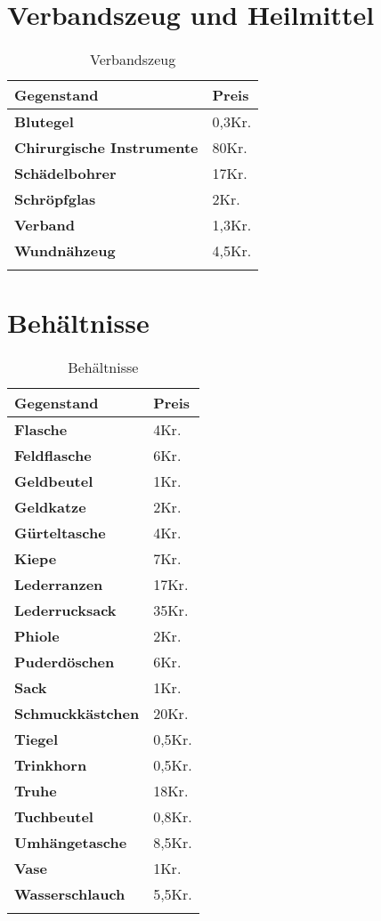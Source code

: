 \section{Verbandszeug und Heilmittel}
\begin{longtable}{|p{5cm}|p{2cm}|}
\hline
\textbf{Gegenstand} & \textbf{Preis} \\ \hline
\textbf{Blutegel} & 0,3Kr. \\ \hline
\textbf{Chirurgische Instrumente} & 80Kr. \\ \hline
\textbf{Schädelbohrer} & 17Kr. \\ \hline
\textbf{Schröpfglas} & 2Kr. \\ \hline
\textbf{Verband} & 1,3Kr. \\ \hline
\textbf{Wundnähzeug} & 4,5Kr. \\ \hline

\caption{Verbandszeug}
\label{tab:Verbandszeug}
\end{longtable}

\section{Behältnisse}
\begin{longtable}{|p{5cm}|p{2cm}|}
\hline
\textbf{Gegenstand} & \textbf{Preis} \\ \hline
\textbf{Flasche} & 4Kr. \\ \hline
\textbf{Feldflasche} & 6Kr. \\ \hline
\textbf{Geldbeutel} & 1Kr. \\ \hline
\textbf{Geldkatze} & 2Kr. \\ \hline
\textbf{Gürteltasche} & 4Kr. \\ \hline
\textbf{Kiepe} & 7Kr. \\ \hline
\textbf{Lederranzen} & 17Kr. \\ \hline
\textbf{Lederrucksack} & 35Kr. \\ \hline
\textbf{Phiole} & 2Kr. \\ \hline
\textbf{Puderdöschen} & 6Kr. \\ \hline
\textbf{Sack} & 1Kr. \\ \hline
\textbf{Schmuckkästchen} & 20Kr. \\ \hline
\textbf{Tiegel} & 0,5Kr. \\ \hline
\textbf{Trinkhorn} & 0,5Kr. \\ \hline
\textbf{Truhe} & 18Kr. \\ \hline
\textbf{Tuchbeutel} & 0,8Kr. \\ \hline
\textbf{Umhängetasche} & 8,5Kr. \\ \hline
\textbf{Vase} & 1Kr. \\ \hline
\textbf{Wasserschlauch} & 5,5Kr. \\ \hline

\caption{Behältnisse}
\label{tab:Behältnisse}
\end{longtable}


